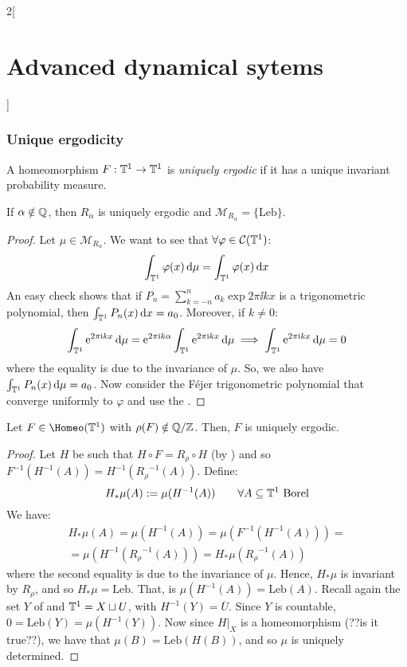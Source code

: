 \documentclass[../../../main_math.tex]{subfiles}
\begin{document}
\begin{multicols}{2}[\section{Advanced dynamical sytems}]
  \subsubsection{Unique ergodicity}
  \begin{definition}
    A homeomorphism $F:\mathbb{T}^1\to\mathbb{T}^1$ is \emph{uniquely ergodic} if it has a unique invariant probability measure.
  \end{definition}
  \begin{lemma}
    If $\alpha\notin \mathbb{Q}$, then $R_\alpha$ is uniquely ergodic and $\mathcal{M}_{R_\alpha}=\{\text{Leb}\}$.
  \end{lemma}
  \begin{proof}
    Let $\mu\in\mathcal{M}_{R_\alpha}$. We want to see that $\forall \varphi\in \mathcal{C}(\mathbb{T}^1)$:
    $$
      \int_{\mathbb{T}^1}\varphi(x)\dd{\mu}=\int_{\mathbb{T}^1}\varphi(x)\dd{x}
    $$
    An easy check shows that if $P_n=\sum_{k=-n}^na_k\exp{2\pi\ii k x}$ is a trigonometric polynomial, then $\int_{\mathbb{T}^1}P_n(x)\dd{x}=a_0$. Moreover, if $k\ne 0$:
    $$
      \int_{\mathbb{T}^1}\mathrm{e}^{2\pi\mathrm{i} kx}\dd{\mu}=\mathrm{e}^{2\pi\mathrm{i} k\alpha}\int_{\mathbb{T}^1}\mathrm{e}^{2\pi\mathrm{i} kx}\dd{\mu}\implies \int_{\mathbb{T}^1}\mathrm{e}^{2\pi\mathrm{i} kx}\dd{\mu}=0
    $$
    where the equality is due to the invariance of $\mu$. So, we also have $\int_{\mathbb{T}^1}P_n(x)\dd{\mu}=a_0$. Now consider the Féjer trigonometric polynomial that converge uniformly to $\varphi$ and use the .
  \end{proof}
  \begin{proposition}
    Let $F\in\Homeo(\TT^1)$ with $\rho(F)\notin\quot{\QQ}{\ZZ}$. Then, $F$ is uniquely ergodic.
  \end{proposition}
  \begin{proof}
    Let $H$ be such that $H\circ F=R_\rho\circ H$ (by ) and so $F^{-1}(H^{-1}(A))=H^{-1}({R_\rho}^{-1}(A))$. Define:
    $$
      H_*\mu(A):=\mu(H^{-1}(A))\qquad \forall A\subseteq \mathbb{T}^1\text{ Borel}
    $$
    We have:
    \begin{multline*}
      H_*\mu(A)=\mu(H^{-1}(A))=\mu(F^{-1}(H^{-1}(A)))=\\=\mu(H^{-1}({R_\rho}^{-1}(A)))=H_*\mu({R_\rho}^{-1}(A))
    \end{multline*}
    where the second equality is due to the invariance of $\mu$. Hence, $H_*\mu$ is invariant by $R_\rho$, and so $H_*\mu=\text{Leb}$. That, is $\mu(H^{-1}(A))=\text{Leb}(A)$. Recall again the set $Y$ of  and $\mathbb{T}^1=X\sqcup U$, with $H^{-1}(Y)=\overline{U}$. Since $Y$ is countable, $0=\text{Leb}(Y)=\mu(H^{-1}(Y))$. Now since $H|_X$ is a homeomorphism (??is it true??), we have that $\mu(B)=\text{Leb}(H(B))$, and so $\mu$ is uniquely determined.

\end{proof}
\end{multicols}
\end{document}
